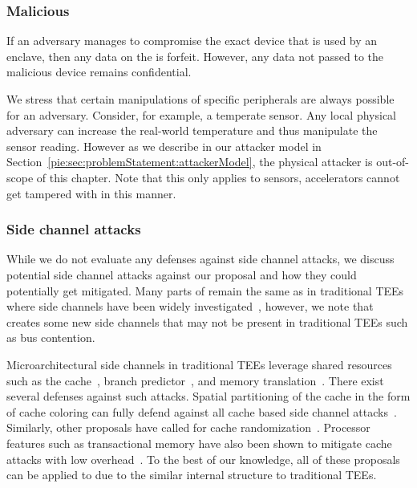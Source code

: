 \subsubsection{Malicious \sphw}
If an adversary manages to compromise the exact device that is used by an enclave, then any data on the \sphw is forfeit. However, any data not passed to the malicious device remains confidential.

We stress that certain manipulations of specific peripherals are always possible for an adversary. Consider, for example, a temperate sensor. Any local physical adversary can increase the real-world temperature and thus manipulate the sensor reading. However as we describe in our attacker model in Section~\ref{pie:sec:problemStatement:attackerModel}, the physical attacker is out-of-scope of this chapter. Note that this only applies to sensors, accelerators cannot get tampered with in this manner.

\subsubsection{Side channel attacks}
While we do not evaluate any defenses against side channel attacks, we discuss potential side channel attacks against our proposal and how they could potentially get mitigated. Many parts of \name{} remain the same as in traditional TEEs where side channels have been widely investigated~\cite{brasser2017software,brasser2019dr,gruss2017strongsidechannel}, however, we note that \name{} creates some new side channels that may not be present in traditional TEEs such as bus contention. 

\setcounter{para}{0}
Microarchitectural side channels in traditional TEEs leverage shared resources such as the cache~\cite{brasser2017software}, branch predictor~\cite{lee2017inferring}, and memory translation~\cite{xu2015controlled}. There exist several defenses against such attacks. Spatial partitioning of the cache in the form of cache coloring can fully defend against all cache based side channel attacks~\cite{costan2016sanctum,zhang2009cachecoloring,zhaosonicboom}. Similarly, other proposals have called for cache randomization~\cite{brasser2019dr,werner2019scattercache}. Processor features such as transactional memory have also been shown to mitigate cache attacks with low overhead~\cite{gruss2017strongsidechannel}. To the best of our knowledge, all of these proposals can be applied to \name{} due to the similar internal structure to traditional TEEs.

